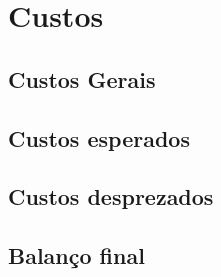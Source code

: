 \chapter{Custos}

\section{Custos Gerais}

\section{Custos esperados}

\section{Custos desprezados}

\section{Balanço final}
